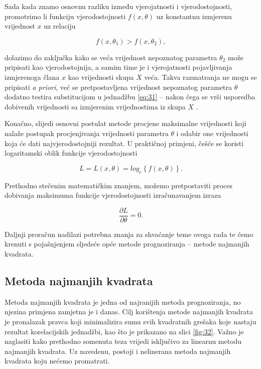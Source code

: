 \documentclass[a4paper,12pt,oneside]{memoir}
\begin{document}
                
                Sada kada znamo osnovnu razliku između vjerojatnosti i vjerodostojnosti, promotrimo li funkciju vjerodostojnosti $f(x,\theta)$ uz konstantnu izmjerenu vrijednost $x$ uz relaciju

                \begin{equation}
                    f(x,\theta_1)>f(x,\theta_2),
                    \label{eq:33}
                \end{equation}

            dolazimo do zaključka kako se veća vrijednost nepoznatog parametra $\theta_2$ može pripisati kao vjerodostojnija, a samim time je i vjerojatnosti pojavljivanja izmjerenoga člana $x$ kao vrijednosti skupa $X$ veća. Takva razmatranja ne mogu se pripisati \textit{a priori}, već se pretpostavljena vrijednost nepoznatog parametra $\theta$ dodatno testira substitucijom u jednadžbu \eqref{eq:31} -- nakon čega se vrši usporedba dobivenih vrijednosti sa izmjerenim vrijednostima iz skupa $X$ \cite{Broersen}.

                Konačno, slijedi osnovni postulat metode procjene maksimalne vrijednosti koji nalaže postupak procjenjivanja vrijednosti parametra $\theta$ i odabir one vrijednosti koja će dati najvjerodostojniji rezultat. U praktičnoj primjeni, češće se koristi logaritamski oblik funkcije vjerodostojnosti
                
                \begin{equation}
                    L=L(x,\theta)=log_e\left\{f(x,\theta)\right\}.
                \end{equation}
        
                Prethodno stečenim matematičkim znanjem, možemo pretpostaviti proces dobivanja maksimuma funkcije vjerodostojnosti izračunavanjem izraza
                
                \begin{equation}
                    \frac{\partial L}{\partial \theta}=0.
                \end{equation}
                
                Daljnji proračun nadilazi potrebna znanja za shvaćanje teme ovoga rada te ćemo krenuti s pojašnjenjem sljedeće opće metode prognoziranja -- metode najmanjih kvadrata.

            \subsection{Metoda najmanjih kvadrata}
            \label{subs:LS}
                Metoda najmanjih kvadrata je jedna od najranijih metoda prognoziranja, no njezina primjena zamjetna je i danas. Cilj korištenja metode najmanjih kvadrata je pronalazak pravca koji minimalizira sumu svih kvadratnih grešaka koje nastaju rezultat korelacijskih jednadžbi, kao što je prikazano na slici \ref{fig:32}. Važno je naglasiti kako prethodno somenuta teza vrijedi isključivo za linearnu metodu najmanjih kvadrata. Uz navedenu, postoji i nelinerana metoda najmanjih kvadrata koju nećemo promatrati.
\end{document}
